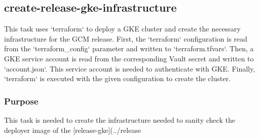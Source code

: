 \subsection{create-release-gke-infrastructure}\label{subsec:create-release-gke-infrastructure}

This task uses `terraform` to deploy a GKE cluster and create the necessary infrastructure for the GCM release.
First, the `terraform` configuration is read from the `{terraform_config}` parameter and written to `terraform.tfvars`.
Then, a GKE service account is read from the corresponding Vault secret and written to `account.json`.
This service account is needed to authenticate with GKE.
Finally, `terraform` is executed with the given configuration to create the cluster.

\subsubsection{Purpose}\label{subsubsec:crgi-Purpose}

This task is needed to create the infrastructure needed to sanity check the deployer image of the [release-gke](../release%

